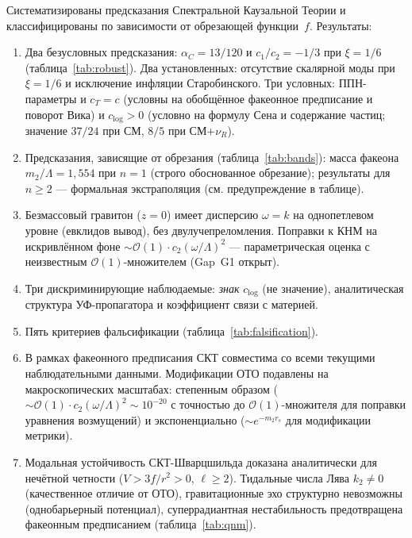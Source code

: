 \documentclass[12pt,a4paper]{article}
\theoremstyle{plain}
\theoremstyle{definition}
\theoremstyle{remark}
\newcommand{\order}{\mathcal{O}}
\begin{document}
Систематизированы предсказания Спектральной Каузальной Теории
и классифицированы по зависимости от обрезающей функции~$f$.
Результаты:

\begin{enumerate}[(1)]
\item Два безусловных предсказания: $\alpha_C = 13/120$ и
  $c_1/c_2 = -1/3$ при $\xi = 1/6$
  (таблица~\ref{tab:robust}). Два установленных: отсутствие
  скалярной моды при $\xi = 1/6$ и исключение инфляции
  Старобинского. Три условных: ППН-параметры и $c_T = c$
  (условны на обобщённое факеонное предписание и поворот
  Вика) и $c_{\log} > 0$ (условно на формулу Сена и
  содержание частиц; значение $37/24$ при СМ, $8/5$ при
  СМ$+\nu_R$).

\item Предсказания, зависящие от обрезания
  (таблица~\ref{tab:bands}): масса факеона
  $m_2/\Lambda = 1{,}554$ при $n = 1$ (строго обоснованное
  обрезание); результаты для $n \geq 2$ --- формальная
  экстраполяция (см. предупреждение в таблице).

\item Безмассовый гравитон ($z = 0$) имеет дисперсию
  $\omega = k$ на однопетлевом уровне (евклидов вывод), без
  двулучепреломления. Поправки к КНМ на искривлённом фоне
  $\sim \order(1) \cdot c_2(\omega/\Lambda)^2$ --- параметрическая
  оценка с неизвестным $\order(1)$-множителем (Gap~G1 открыт).

\item Три дискриминирующие наблюдаемые: \emph{знак} $c_{\log}$
  (не значение), аналитическая структура УФ-пропагатора
  и коэффициент связи с материей.

\item Пять критериев фальсификации
  (таблица~\ref{tab:falsification}).

\item В рамках факеонного предписания СКТ совместима со всеми
  текущими наблюдательными данными. Модификации ОТО подавлены
  на макроскопических масштабах:
  степенным образом ($\sim \order(1) \cdot c_2(\omega/\Lambda)^2
  \sim 10^{-20}$ с точностью до $\order(1)$-множителя
  для поправки уравнения возмущений) и экспоненциально
  ($\sim e^{-m_2 r_s}$ для модификации метрики).

\item Модальная устойчивость СКТ-Шварцшильда доказана
  аналитически для нечётной четности ($V > 3f/r^2 > 0$,
  $\ell \geq 2$). Тидальные числа Лява $k_2 \neq 0$
  (качественное отличие от ОТО), гравитационные эхо структурно
  невозможны (однобарьерный потенциал), суперрадиантная
  нестабильность предотвращена факеонным предписанием
  (таблица~\ref{tab:qnm}).
\end{enumerate}
\end{document}
